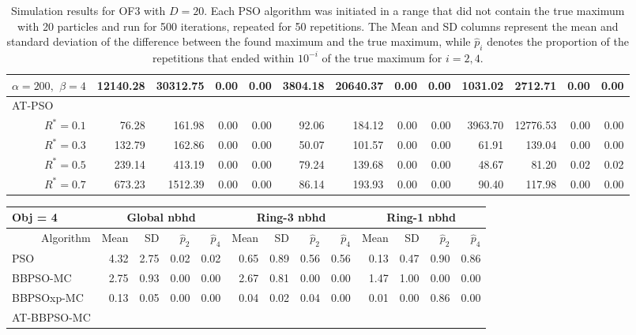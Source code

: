 \documentclass[12pt]{article}
\begin{document}
\begin{appendix}
\begin{table}[ht]
{\begin{tabular}{r|rrrr|rrrr|rrrr}
  $\alpha = 200,$ $\beta =4$ & 12140.28 & 30312.75 & 0.00 & 0.00 & 3804.18 & 20640.37 & 0.00 & 0.00 & 1031.02 & 2712.71 & 0.00 & 0.00 \\ 
\hline
\multicolumn{1}{l|}{AT-PSO} &&&&&&&&&&&&\\
  $R^* = 0.1$ & 76.28 & 161.98 & 0.00 & 0.00 & 92.06 & 184.12 & 0.00 & 0.00 & 3963.70 & 12776.53 & 0.00 & 0.00 \\ 
  $R^* = 0.3$ & 132.79 & 162.86 & 0.00 & 0.00 & 50.07 & 101.57 & 0.00 & 0.00 & 61.91 & 139.04 & 0.00 & 0.00 \\ 
  $R^* = 0.5$ & 239.14 & 413.19 & 0.00 & 0.00 & 79.24 & 139.68 & 0.00 & 0.00 & 48.67 & 81.20 & 0.02 & 0.02 \\ 
  $R^* = 0.7$ & 673.23 & 1512.39 & 0.00 & 0.00 & 86.14 & 193.93 & 0.00 & 0.00 & 90.40 & 117.98 & 0.00 & 0.00 \\ 
   \hline
\end{tabular}
}
\caption{Simulation results for OF3 with $D=20$. Each PSO algorithm was initiated in a range that did not contain the true maximum with 20 particles and run for 500 iterations, repeated for 50 repetitions. The Mean and SD columns represent the mean and standard deviation of the difference between the found maximum and the true maximum, while $\widehat{p}_i$ denotes the proportion of the repetitions that ended within $10^{-i}$ of the true maximum for $i=2,4$.}
\label{tab:psosim3}
\end{table}
\begin{table}[ht]
\centering
\footnotesize{
\begin{tabular}{r|rrrr|rrrr|rrrr}
\multicolumn{1}{l}{Obj = 4} & \multicolumn{4}{c}{Global nbhd} & \multicolumn{4}{c}{Ring-3 nbhd} & \multicolumn{4}{c}{Ring-1 nbhd}\\
  \hline
Algorithm & Mean & SD & $\widehat{p}_2$ & $\widehat{p}_4$ & Mean & SD & $\widehat{p}_2$ & $\widehat{p}_4$ & Mean & SD & $\widehat{p}_2$ & $\widehat{p}_4$ \\ 
  \hline
\multicolumn{1}{l|}{PSO} & 4.32 & 2.75 & 0.02 & 0.02 & 0.65 & 0.89 & 0.56 & 0.56 & 0.13 & 0.47 & 0.90 & 0.86 \\ 
  \multicolumn{1}{l|}{BBPSO-MC} & 2.75 & 0.93 & 0.00 & 0.00 & 2.67 & 0.81 & 0.00 & 0.00 & 1.47 & 1.00 & 0.00 & 0.00 \\ 
  \multicolumn{1}{l|}{BBPSOxp-MC} & 0.13 & 0.05 & 0.00 & 0.00 & 0.04 & 0.02 & 0.04 & 0.00 & 0.01 & 0.00 & 0.86 & 0.00 \\ 
\hline
\multicolumn{1}{l|}{AT-BBPSO-MC} &&&&&&&&&&&&\\

\end{tabular}}
\end{table}
\end{appendix}
\end{document}
